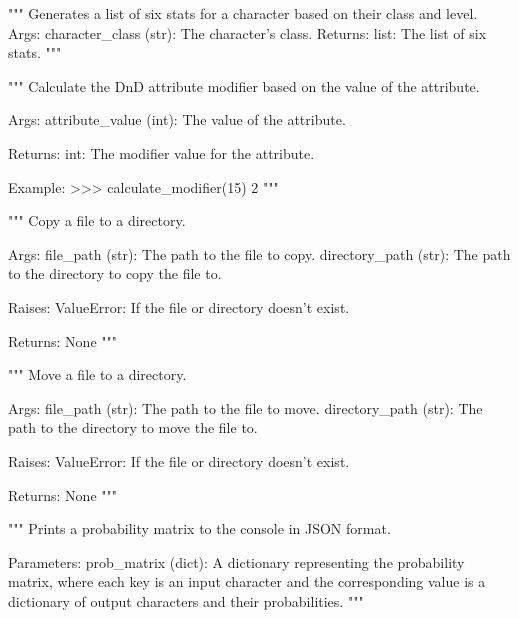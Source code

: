 \begin{codebox}[generate\_character\_stats(character\_class, level=1)]
"""
Generates a list of six stats for a character based on their class and level.
Args:
    character_class (str): The character's class.
Returns:
    list: The list of six stats.
"""
\end{codebox}

\begin{codebox}
"""
Calculate the DnD attribute modifier based on the value of the attribute.

Args:
    attribute_value (int): The value of the attribute.

Returns:
    int: The modifier value for the attribute.

Example:
    >>> calculate_modifier(15)
    2
"""
\end{codebox}

\begin{codebox}
"""
Copy a file to a directory.

Args:
    file_path (str): The path to the file to copy.
    directory_path (str): The path to the directory to copy the file to.

Raises:
    ValueError: If the file or directory doesn't exist.

Returns:
    None
"""
\end{codebox}

\begin{codebox}
"""
Move a file to a directory.

Args:
    file_path (str): The path to the file to move.
    directory_path (str): The path to the directory to move the file to.

Raises:
    ValueError: If the file or directory doesn't exist.

Returns:
    None
"""
\end{codebox}

\begin{codebox}
"""
Prints a probability matrix to the console in JSON format.

Parameters:
    prob_matrix (dict): A dictionary representing the probability matrix,
    where each key is an input character and the corresponding value is a dictionary
    of output characters and their probabilities.
"""
\end{codebox}

